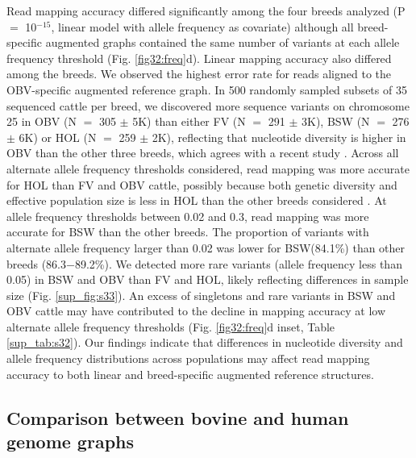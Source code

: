 \documentclass[../main.tex]{subfiles}
\begin{document}
Read mapping accuracy differed significantly among the four breeds analyzed (P $=$ 10$^{-15}$, linear model with allele frequency as covariate) although all breed-specific augmented graphs contained the same number of variants at each allele frequency threshold (Fig. \ref{fig32:freq}d). Linear mapping accuracy also differed among the breeds. We observed the highest error rate for reads aligned to the OBV-specific augmented reference graph. In 500 randomly sampled subsets of 35 sequenced cattle per breed, we discovered more sequence variants on chromosome 25 in OBV (N $=$ 305 $\pm$ 5K) than either FV (N $=$ 291 $\pm$ 3K), BSW (N $=$ 276 $\pm$ 6K) or HOL (N $=$ 259 $\pm$ 2K), reflecting that nucleotide diversity is higher in OBV than the other three breeds, which agrees with a recent study \citep{bhati2020assessing}. Across all alternate allele frequency thresholds considered, read mapping was more accurate for HOL than FV and OBV cattle, possibly because both genetic diversity and effective population size is less in HOL than the other breeds considered \citep{signer2017population}. At allele frequency thresholds between 0.02 and 0.3, read mapping was more accurate for BSW than the other breeds. The proportion of variants with alternate allele frequency larger than 0.02 was lower for BSW(84.1\%) than other breeds (86.3$-$89.2\%). We detected more rare variants (allele frequency less than 0.05) in BSW and OBV than FV and HOL, likely reflecting differences in sample size (Fig. \ref{sup_fig:s33}). An excess of singletons and rare variants in BSW and OBV cattle may have contributed to the decline in mapping accuracy at low alternate allele frequency thresholds (Fig. \ref{fig32:freq}d inset, Table \ref{sup_tab:s32}). Our findings indicate that differences in nucleotide diversity and allele frequency distributions across populations may affect read mapping accuracy to both linear and breed-specific augmented reference structures.

\subsection*{Comparison between bovine and human genome graphs}
\end{document}

